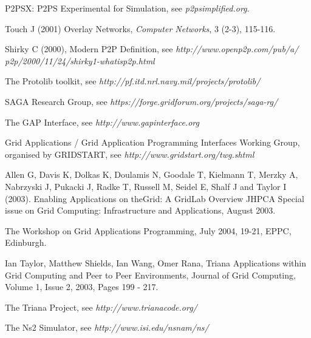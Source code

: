 %
%

%
% 
% 
%
\begin{thebibliography}{99.}
%
%
%


  P2PSX: P2PS Experimental for Simulation, see 
\emph{p2psimplified.org}.

 Touch J (2001) Overlay Networks, \emph{Computer
Networks}, 3 (2-3), 115-116.

 Shirky C (2000), Modern P2P Definition, see
\emph{http://www.openp2p.com/pub/a/\\p2p/2000/11/24/shirky1-whatisp2p.html}

 The Protolib toolkit, see \emph{http://pf.itd.nrl.navy.mil/projects/protolib/}

 SAGA Research Group, see \emph{https://forge.gridforum.org/projects/saga-rg/}

 The GAP Interface, see \emph{http://www.gapinterface.org}


 Grid Applications / Grid Application Programming Interfaces 
Working Group, organised by GRIDSTART, see 
\emph{http://www.gridstart.org/twg.shtml}

 Allen G, Davis K, Dolkas K, Doulamis N, Goodale T,
Kielmann T, Merzky A, Nabrzyski J, Pukacki J, Radke T, Russell M,
Seidel E, Shalf J and Taylor I (2003). Enabling Applications on
theGrid: A GridLab Overview JHPCA Special issue on Grid Computing:
Infrastructure and Applications, August 2003.

  The Workshop on Grid Applications Programming, July 2004,
19-21, EPPC, Edinburgh.

 Ian Taylor, Matthew Shields, Ian Wang, Omer Rana, Triana Applications within Grid Computing and Peer to Peer Environments, Journal of Grid Computing, Volume 1, Issue 2,   2003, Pages 199 - 217.

 The Triana Project, see \emph{http://www.trianacode.org/}

 The Ns2 Simulator, see \emph{http://www.isi.edu/nsnam/ns/}


\end{thebibliography}
